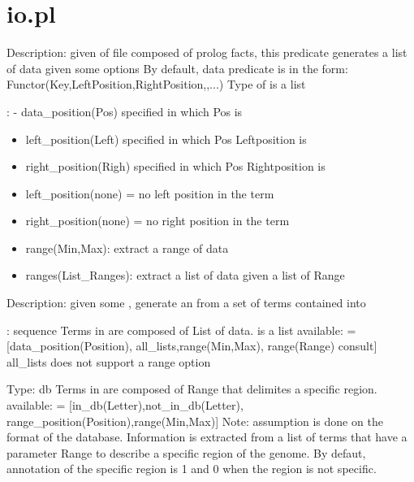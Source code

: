 


\section{io.pl}

\label{sec:io}

\begin{description}
Description: given of file composed of prolog facts,
this predicate generates a list of data given some options
By default, data predicate is in the form:
Functor(Key,LeftPosition,RightPosition,,...)
Type of  is a list

: - data_position(Pos) specified in which Pos  is

\begin{itemize}
    \item left_position(Left) specified in which Pos Leftposition is
    \item right_position(Righ) specified in which Pos Rightposition is
    \item left_position(none) = no left position in the term
    \item right_position(none) = no right position in the term
    \item range(Min,Max): extract a range of data
    \item ranges(List_Ranges): extract a list of data given a list of Range
\end{itemize}

Description: given some , generate an  from a set of terms contained into 

\begin{center}
: sequence
Terms in  are composed of List of data.
 is a list
 available:  = [data_position(Position),
all_lists,range(Min,Max),
range(Range)
consult]
all_lists does not support a range option
\end{center}

\begin{center}
Type: db
Terms in  are composed of Range that delimites a specific region.
 available:  = [in_db(Letter),not_in_db(Letter),
range_position(Position),range(Min,Max)]
Note: assumption is done on the format of the database. Information is extracted from a list
of terms that have a parameter Range to describe a specific region of the genome.
By defaut, annotation of the specific region is 1 and 0 when the region is not specific.
\end{center}


\end{description}
